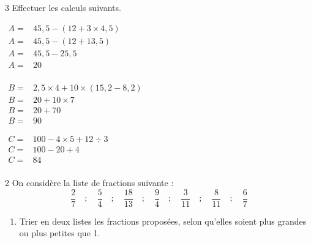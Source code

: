 \documentclass[a4paper]{book}
\begin{document}
{    \begin{exerciceNote}{3}
        Effectuer les calculs suivants.
   
        \begin{minipage}{0.3\linewidth}
            $\begin{array}{ll}
                A = & 45,5 - (12 + 3 \times 4,5) \\[2ex]
                A = & 45,5 - (12 +13,5) \\[2ex]
                A = & 45,5 - 25,5 \\[2ex]
                A = & 20 \\[2ex]
            \end{array}$
        \end{minipage}
        \vline
        \begin{minipage}{0.35\linewidth}
            $\begin{array}{ll}
                B = & 2,5 \times 4 + 10 \times (15,2 - 8,2) \\[2ex]
                B = & 20 + 10 \times 7\\[2ex]
                B = & 20 + 70 \\[2ex]
                B = & 90 
            \end{array}$
        \end{minipage}
        \vline
        \begin{minipage}{0.3\linewidth}
            $\begin{array}{ll}
                C = & 100 - 4 \times 5 + 12 \div 3 \\[2ex]
                C = & 100 - 20 + 4\\[2ex]
                C = & 84 \\
            \end{array}$
        \end{minipage}
    \end{exerciceNote}


    \begin{exerciceNote}{2}
        On considère la liste de fractions suivante :
        \[ \frac{2}{7} \quad ; \quad \frac{5}{4} \quad ; \quad \frac{18}{13} \quad ; \quad \frac{9}{4} \quad ; \quad \frac{3}{11} \quad ; \quad \frac{8}{11} \quad ; \quad \frac{6}{7} \]
        
        \begin{enumerate}[leftmargin=*]
            \item Trier en deux listes les fractions proposées, selon qu'elles soient plus grandes ou plus petites que 1.


\end{enumerate}
\end{exerciceNote}}
\end{document}
